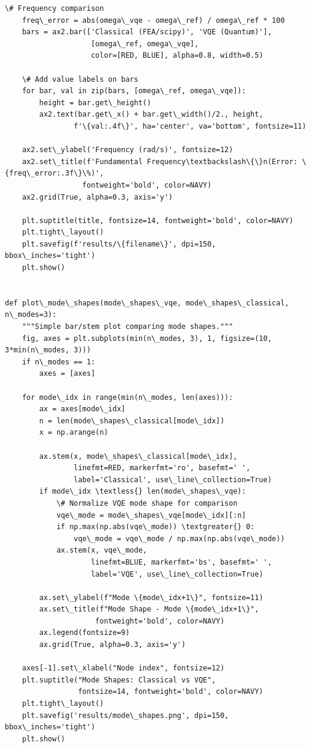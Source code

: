 \documentclass[12pt, a4paper]{article}
\begin{document}
\begin{lstlisting}[style=codestyle, caption={{visualize.py --- Beam and Truss Visualizations}}]
    \# Frequency comparison
    freq\_error = abs(omega\_vqe - omega\_ref) / omega\_ref * 100
    bars = ax2.bar(['Classical (FEA/scipy)', 'VQE (Quantum)'],
                    [omega\_ref, omega\_vqe],
                    color=[RED, BLUE], alpha=0.8, width=0.5)

    \# Add value labels on bars
    for bar, val in zip(bars, [omega\_ref, omega\_vqe]):
        height = bar.get\_height()
        ax2.text(bar.get\_x() + bar.get\_width()/2., height,
                f'\{val:.4f\}', ha='center', va='bottom', fontsize=11)

    ax2.set\_ylabel('Frequency (rad/s)', fontsize=12)
    ax2.set\_title(f'Fundamental Frequency\textbackslash\{\}n(Error: \{freq\_error:.3f\}\%)',
                  fontweight='bold', color=NAVY)
    ax2.grid(True, alpha=0.3, axis='y')

    plt.suptitle(title, fontsize=14, fontweight='bold', color=NAVY)
    plt.tight\_layout()
    plt.savefig(f'results/\{filename\}', dpi=150, bbox\_inches='tight')
    plt.show()


def plot\_mode\_shapes(mode\_shapes\_vqe, mode\_shapes\_classical, n\_modes=3):
    """Simple bar/stem plot comparing mode shapes."""
    fig, axes = plt.subplots(min(n\_modes, 3), 1, figsize=(10, 3*min(n\_modes, 3)))
    if n\_modes == 1:
        axes = [axes]

    for mode\_idx in range(min(n\_modes, len(axes))):
        ax = axes[mode\_idx]
        n = len(mode\_shapes\_classical[mode\_idx])
        x = np.arange(n)

        ax.stem(x, mode\_shapes\_classical[mode\_idx],
                linefmt=RED, markerfmt='ro', basefmt=' ',
                label='Classical', use\_line\_collection=True)
        if mode\_idx \textless{} len(mode\_shapes\_vqe):
            \# Normalize VQE mode shape for comparison
            vqe\_mode = mode\_shapes\_vqe[mode\_idx][:n]
            if np.max(np.abs(vqe\_mode)) \textgreater{} 0:
                vqe\_mode = vqe\_mode / np.max(np.abs(vqe\_mode))
            ax.stem(x, vqe\_mode,
                    linefmt=BLUE, markerfmt='bs', basefmt=' ',
                    label='VQE', use\_line\_collection=True)

        ax.set\_ylabel(f"Mode \{mode\_idx+1\}", fontsize=11)
        ax.set\_title(f"Mode Shape - Mode \{mode\_idx+1\}",
                     fontweight='bold', color=NAVY)
        ax.legend(fontsize=9)
        ax.grid(True, alpha=0.3, axis='y')

    axes[-1].set\_xlabel("Node index", fontsize=12)
    plt.suptitle("Mode Shapes: Classical vs VQE",
                 fontsize=14, fontweight='bold', color=NAVY)
    plt.tight\_layout()
    plt.savefig('results/mode\_shapes.png', dpi=150, bbox\_inches='tight')
    plt.show()



\end{lstlisting}
\end{document}

